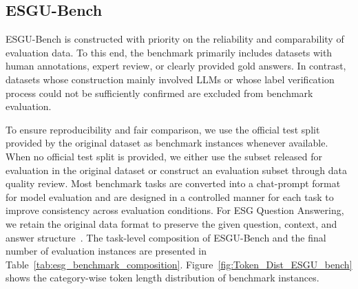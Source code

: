 \documentclass[11pt]{article}
\begin{document}
\subsection{\textsf{ESGU-Bench}}
\label{app:esgu_details}
\textsf{ESGU-Bench} is constructed with priority on the reliability and comparability of evaluation data. To this end, the benchmark primarily includes datasets with human annotations, expert review, or clearly provided gold answers. In contrast, datasets whose construction mainly involved LLMs or whose label verification process could not be sufficiently confirmed are excluded from benchmark evaluation.

To ensure reproducibility and fair comparison, we use the official test split provided by the original dataset as benchmark instances whenever available. When no official test split is provided, we either use the subset released for evaluation in the original dataset or construct an evaluation subset through data quality review. Most benchmark tasks are converted into a chat-prompt format for model evaluation and are designed in a controlled manner for each task to improve consistency across evaluation conditions. For ESG Question Answering, we retain the original data format to preserve the given question, context, and answer structure~\cite{he2025esgenius}. The task-level composition of \textsf{ESGU-Bench} and the final number of evaluation instances are presented in Table~\ref{tab:esg_benchmark_composition}. Figure~\ref{fig:Token_Dist_ESGU_bench} shows the category-wise token length distribution of benchmark instances.

\end{document}
